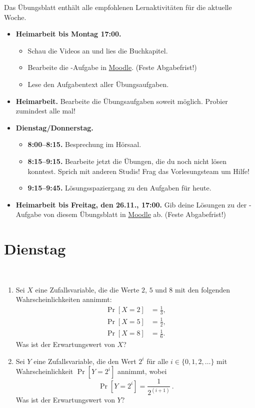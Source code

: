 \documentclass{uebung_cs}
\begin{document}
Das Übungsblatt enthält alle empfohlenen Lernaktivitäten für die aktuelle Woche.

\begin{itemize}
\item \textbf{Heimarbeit bis Montag 17:00.}
    \begin{itemize}
    \item 
    Schau die Videos an und lies die Buchkapitel.
    \item Bearbeite die -Aufgabe in \href{https://moodle.studiumdigitale.uni-frankfurt.de/moodle/course/view.php?id=2241}{Moodle}. (Feste Abgabefrist!)
    \item Lese den Aufgabentext aller Übungsaufgaben.
    \end{itemize}
\item \textbf{Heimarbeit.} Bearbeite die Übungsaufgaben soweit möglich. Probier zumindest alle mal!
\item \textbf{Dienstag/Donnerstag.}
\begin{itemize}
    \item \textbf{8:00--8:15.} Besprechung im Hörsaal.
    \item \textbf{8:15--9:15.} Bearbeite jetzt die Übungen, die du noch nicht lösen konntest. Sprich mit anderen Studis! Frag das Vorlesungsteam um Hilfe!
    \item \textbf{9:15--9:45.} Lösungsspaziergang zu den Aufgaben für heute.
\end{itemize}

\item \textbf{Heimarbeit bis Freitag, den 26.11., 17:00.} Gib deine Lösungen zu der -Aufgabe von diesem Übungsblatt in \href{https://moodle.studiumdigitale.uni-frankfurt.de/moodle/course/view.php?id=2241}{Moodle} ab. (Feste Abgabefrist!)
\end{itemize}

\section*{Dienstag}

\begin{exercise}[Erwartungswerte]\
	\begin{enumerate}
		\item Sei $X$ eine Zufallsvariable, die die Werte $2$, $5$ und $8$ mit den folgenden Wahrscheinlichkeiten annimmt:
		\begin{align*}
			\Pr[X=2] &= \tfrac{1}{3},\\
			\Pr[X=5] &= \tfrac{1}{2},\\
			\Pr[X=8] &= \tfrac{1}{6}.
		\end{align*}
		Was ist der Erwartungswert von $X$?\\
		
		\item Sei $Y$ eine Zufallsvariable, die den Wert $2^i$ für alle $i \in \{0,1,2,\dots\}$ mit Wahrscheinlichkeit $\Pr[Y=2^i]$ annimmt, wobei \[\Pr[Y=2^i]= \frac{1}{2^{(i+1)}}\,.\]
		Was ist der Erwartungswert von $Y$?
	\end{enumerate}	
\end{exercise}
\end{document}
